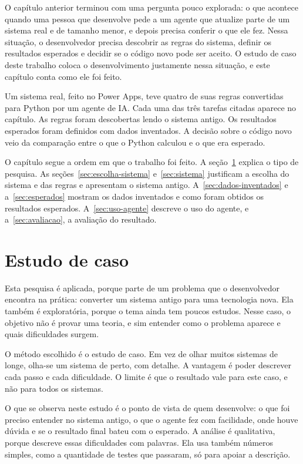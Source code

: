O capítulo anterior terminou com uma pergunta pouco explorada: o que acontece quando uma pessoa que desenvolve pede a um agente que atualize parte de um sistema real e de tamanho menor, e depois precisa conferir o que ele fez. Nessa situação, o desenvolvedor precisa descobrir as regras do sistema, definir os resultados esperados e decidir se o código novo pode ser aceito. O estudo de caso deste trabalho coloca o desenvolvimento justamente nessa situação, e este capítulo conta como ele foi feito.

Um sistema real, feito no Power Apps, teve quatro de suas regras convertidas para Python por um agente de IA. Cada uma das três tarefas citadas aparece no capítulo. As regras foram descobertas lendo o sistema antigo. Os resultados esperados foram definidos com dados inventados. A decisão sobre o código novo veio da comparação entre o que o Python calculou e o que era esperado.

O capítulo segue a ordem em que o trabalho foi feito. A seção~\ref{sec:estudo-caso} explica o tipo de pesquisa. As seções~\ref{sec:escolha-sistema} e~\ref{sec:sistema} justificam a escolha do sistema e das regras e apresentam o sistema antigo. A~\ref{sec:dados-inventados} e a~\ref{sec:esperados} mostram os dados inventados e como foram obtidos os resultados esperados. A~\ref{sec:uso-agente} descreve o uso do agente, e a~\ref{sec:avaliacao}, a avaliação do resultado.

\section{Estudo de caso}
\label{sec:estudo-caso}

Esta pesquisa é aplicada, porque parte de um problema que o desenvolvedor encontra na prática: converter um sistema antigo para uma tecnologia nova. Ela também é exploratória, porque o tema ainda tem poucos estudos. Nesse caso, o objetivo não é provar uma teoria, e sim entender como o problema aparece e quais dificuldades surgem.

O método escolhido é o estudo de caso. Em vez de olhar muitos sistemas de longe, olha-se um sistema de perto, com detalhe. A vantagem é poder descrever cada passo e cada dificuldade. O limite é que o resultado vale para este caso, e não para todos os sistemas.

O que se observa neste estudo é o ponto de vista de quem desenvolve: o que foi preciso entender no sistema antigo, o que o agente fez com facilidade, onde houve dúvida e se o resultado final bateu com o esperado. A análise é qualitativa, porque descreve essas dificuldades com palavras. Ela usa também números simples, como a quantidade de testes que passaram, só para apoiar a descrição.

